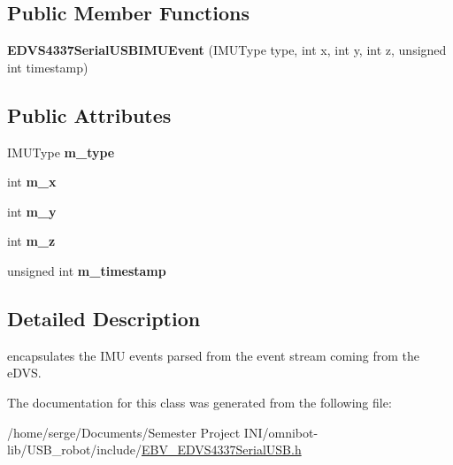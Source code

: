\subsection*{Public Member Functions}
\begin{DoxyCompactItemize}
\item 
\hypertarget{struct_e_d_v_s4337_serial_u_s_b_i_m_u_event_a07c079c07eb2d0c70089cc3edbd7a168}{}{\bfseries E\+D\+V\+S4337\+Serial\+U\+S\+B\+I\+M\+U\+Event} (I\+M\+U\+Type type, int x, int y, int z, unsigned int timestamp)\label{struct_e_d_v_s4337_serial_u_s_b_i_m_u_event_a07c079c07eb2d0c70089cc3edbd7a168}

\end{DoxyCompactItemize}
\subsection*{Public Attributes}
\begin{DoxyCompactItemize}
\item 
\hypertarget{struct_e_d_v_s4337_serial_u_s_b_i_m_u_event_aa8edf2c7de82e894e6fc814b5390510f}{}I\+M\+U\+Type {\bfseries m\+\_\+type}\label{struct_e_d_v_s4337_serial_u_s_b_i_m_u_event_aa8edf2c7de82e894e6fc814b5390510f}

\item 
\hypertarget{struct_e_d_v_s4337_serial_u_s_b_i_m_u_event_abbb34d1ed175541706b5ec8ec26da02d}{}int {\bfseries m\+\_\+x}\label{struct_e_d_v_s4337_serial_u_s_b_i_m_u_event_abbb34d1ed175541706b5ec8ec26da02d}

\item 
\hypertarget{struct_e_d_v_s4337_serial_u_s_b_i_m_u_event_a879673f328146dc4704e086a15d3be9c}{}int {\bfseries m\+\_\+y}\label{struct_e_d_v_s4337_serial_u_s_b_i_m_u_event_a879673f328146dc4704e086a15d3be9c}

\item 
\hypertarget{struct_e_d_v_s4337_serial_u_s_b_i_m_u_event_abf017343cf4fdce2385b84236eb21809}{}int {\bfseries m\+\_\+z}\label{struct_e_d_v_s4337_serial_u_s_b_i_m_u_event_abf017343cf4fdce2385b84236eb21809}

\item 
\hypertarget{struct_e_d_v_s4337_serial_u_s_b_i_m_u_event_af3db6c4af22b5a3b224d1325ba6ea5a0}{}unsigned int {\bfseries m\+\_\+timestamp}\label{struct_e_d_v_s4337_serial_u_s_b_i_m_u_event_af3db6c4af22b5a3b224d1325ba6ea5a0}

\end{DoxyCompactItemize}


\subsection{Detailed Description}
encapsulates the I\+M\+U events parsed from the event stream coming from the e\+D\+V\+S. 

The documentation for this class was generated from the following file\+:\begin{DoxyCompactItemize}
\item 
/home/serge/\+Documents/\+Semester Project I\+N\+I/omnibot-\/lib/\+U\+S\+B\+\_\+robot/include/\hyperlink{_e_b_v___e_d_v_s4337_serial_u_s_b_8h}{E\+B\+V\+\_\+\+E\+D\+V\+S4337\+Serial\+U\+S\+B.\+h}\end{DoxyCompactItemize}
